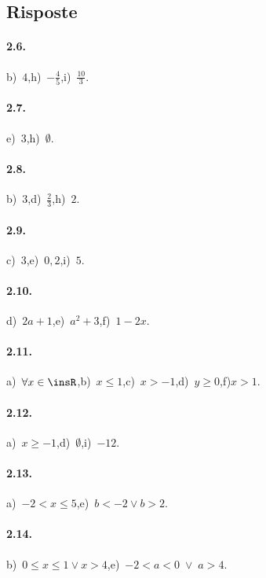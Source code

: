 \subsection{Risposte}

\paragraph{2.6.}
b)~$4$,\quad h)~$-\frac{4}{5}$,\quad i)~$\frac{10}{3}$.

\paragraph{2.7.}
e)~$3$,\quad h)~$\emptyset$.

\paragraph{2.8.}
b)~$3$,\quad d)~$\frac{2}{3}$,\quad h)~$2$.

\paragraph{2.9.}
c)~$3$,\quad e)~$0,2$,\quad i)~$5$.

\paragraph{2.10.}
d)~$2a+1$,\quad e)~$a^2+3$,\quad f)~$1-2x$.

\paragraph{2.11.}
a)~$\forall x\in \insR$,\quad b)~$x\le 1$,\quad c)~$x>-1$,\quad d)~$y\ge 0$,\quad f)$x>1$.

\paragraph{2.12.}
a)~$x\ge -1$,\quad d)~$\emptyset$,\quad i)~$-12$.

\paragraph{2.13.}
a)~$-2<x\le 5$,\quad e)~$b<-2\vee b>2$.

\paragraph{2.14.}
b)~$0\le x\le 1\vee x>4$,\quad e)~$-2<a<0\;\vee \;a>4$.

